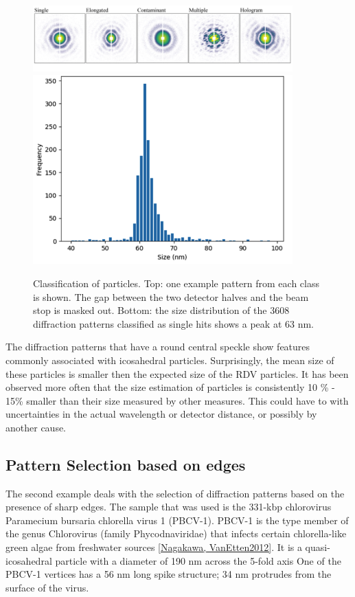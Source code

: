 \begin{figure}[h]
\centering
\includegraphics[width=100mm]{Chapter_09_Results_RDV_classes.png}
\includegraphics[width=100mm]{Chapter_09_Results_RDV_size_distribution.png}\label{fig:Classes}
\caption{Classification of particles. Top: one example pattern from each class is shown. The gap between the two detector halves and the beam stop is masked out. Bottom: the size distribution of the 3608 diffraction patterns classified as single hits shows a peak at 63 nm.}
\end{figure}

The diffraction patterns that have a round central speckle show features commonly associated with icosahedral particles. Surprisingly, the mean size of these particles is smaller then the expected size of the RDV particles. It has been observed more often that the size estimation of particles is consistently 10 \% - 15\% smaller than their size measured by other measures. This could have to with uncertainties in the actual wavelength or detector distance, or possibly by another cause. 


\subsection{Pattern Selection based on edges}
The second example deals with the selection of diffraction patterns based on the presence of sharp edges. The sample that was used is the 331-kbp chlorovirus Paramecium bursaria chlorella virus 1 (PBCV-1). PBCV-1 is the type member of the genus Chlorovirus (family Phycodnaviridae) that infects certain chlorella-like green algae from freshwater sources \ref{Nagakawa, VanEtten2012}. It is a quasi-icosahedral particle with a diameter of 190 nm across the 5-fold axis  One of the PBCV-1 vertices has a 56 nm long spike structure; 34 nm protrudes from the surface of the virus.

